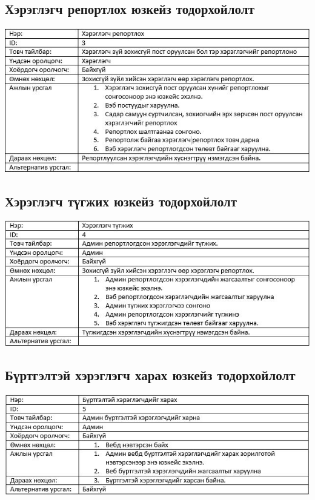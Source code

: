 \documentclass[
oneside, %
english, %
onehalfspacing, %
nolistspacing, %
headsepline, %
]{article} %
\begin{document}
     \subsection{Хэрэглэгч репортлох юзкейз тодорхойлолт }
     \includegraphics[width=\textwidth]{usecaseT3}
     \subsection{Хэрэглэгч түгжих юзкейз тодорхойлолт}
     \includegraphics[width=\textwidth]{usecaseT4}
     \subsection{Бүртгэлтэй хэрэглэгч харах юзкейз тодорхойлолт }
     \includegraphics[width=\textwidth]{usecaseT5}
\end{document}

